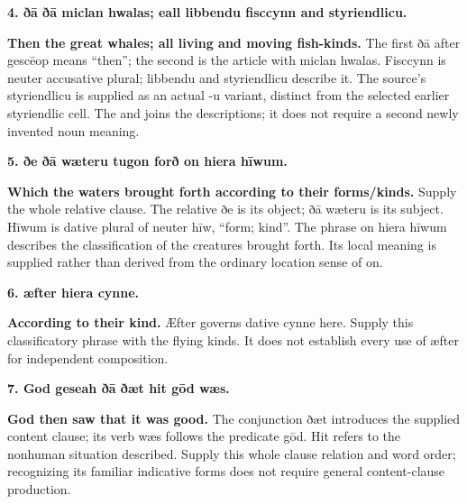 \textbf{4. ðā ðā miclan hwalas; eall libbendu fisccynn and styriendlicu.}

\textbf{Then the great whales; all living and moving fish-kinds.} The first ðā after gescēop means “then”; the second is the article with miclan hwalas. Fisccynn is neuter accusative plural; libbendu and styriendlicu describe it. The source’s styriendlicu is supplied as an actual -u variant, distinct from the selected earlier styriendlic cell. The and joins the descriptions; it does not require a second newly invented noun meaning.

\textbf{5. ðe ðā wæteru tugon forð on hiera hīwum.}

\textbf{Which the waters brought forth according to their forms/\allowbreak{}kinds.} Supply the whole relative clause. The relative ðe is its object; ðā wæteru is its subject. Hīwum is dative plural of neuter hīw, “form; kind”. The phrase on hiera hīwum describes the classification of the creatures brought forth. Its local meaning is supplied rather than derived from the ordinary location sense of on.

\textbf{6. æfter hiera cynne.}

\textbf{According to their kind.} Æfter governs dative cynne here. Supply this classificatory phrase with the flying kinds. It does not establish every use of æfter for independent composition.

\textbf{7. God geseah ðā ðæt hit gōd wæs.}

\textbf{God then saw that it was good.} The conjunction ðæt introduces the supplied content clause; its verb wæs follows the predicate gōd. Hit refers to the nonhuman situation described. Supply this whole clause relation and word order; recognizing its familiar indicative forms does not require general content-clause production.

